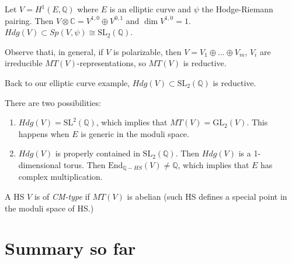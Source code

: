 \begin{example}
\label{example-elliptic-curve}
Let $V = H^1(E,\mathbb{Q})$ where $E$ is an
elliptic curve
and $\psi$ the Hodge-Riemann pairing.
Then $V\otimes \mathbb{C}=V^{1,0}\oplus
V^{0,1}$
and $\dim V^{1,0}=1$.
$Hdg(V) \subset Sp(V,\psi) \cong
\text{SL}_2(\mathbb{Q})$.

Observe thati, in general, if $V$ is
polarizable,
then $V=V_1 \oplus  … \oplus  V_m$, $V_i$ are
irreducible $MT(V)$-representations,
so $MT(V)$ is reductive.

Back to our elliptic curve example,
$Hdg(V) \subset \text{SL}_2(\mathbb{Q})$ is
reductive.

There are two possibilities:
\begin{enumerate}
\item $Hdg(V)=\text{SL}^2(\mathbb{Q})$,
which implies that $MT(V) = \text{GL}_2(V)$.
This happens when $E$ is generic in the
moduli space.

\item $Hdg(V)$ is properly contained in
$\text{SL}_2(\mathbb{Q})$.
Then $Hdg(V)$ is a 1-dimensional torus.
Then $\text{End}_{\mathbb{Q}-HS}(V) \neq
\mathbb{Q}$,
which implies that $E$ has complex
multiplication.
\end{enumerate}
\end{example}

\begin{definition}
\label{definition-cm-type}
A HS $V$ is of  {\it CM-type} if $MT(V)$ is
abelian
(such HS defines a special point in the
moduli space of HS.)
\end{definition}


\section{Summary so far}
\label{section-summary}

